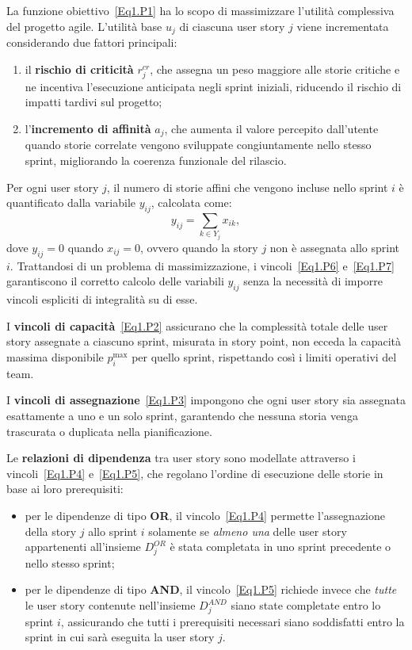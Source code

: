 \documentclass[12pt,a4paper,openright,twoside]{book}
\begin{document}
La funzione obiettivo~\eqref{Eq1.P1} ha lo scopo di massimizzare l'utilità complessiva del progetto agile.  
L'utilità base $u_j$ di ciascuna user story $j$ viene incrementata considerando due fattori principali:
\begin{enumerate}
    \item il \textbf{rischio di criticità} $r^{cr}_j$, che assegna un peso maggiore alle storie critiche e ne incentiva l'esecuzione anticipata negli sprint iniziali, riducendo il rischio di impatti tardivi sul progetto;
    \item l'\textbf{incremento di affinità} $a_j$, che aumenta il valore percepito dall'utente quando storie correlate vengono sviluppate congiuntamente nello stesso sprint, migliorando la coerenza funzionale del rilascio.
\end{enumerate}

Per ogni user story $j$, il numero di storie affini che vengono incluse nello sprint $i$ è quantificato dalla variabile $y_{ij}$, calcolata come:
\[
y_{ij} = \sum_{k \in Y_j} x_{ik},
\]
dove $y_{ij} = 0$ quando $x_{ij} = 0$, ovvero quando la story $j$ non è assegnata allo sprint $i$.  
Trattandosi di un problema di massimizzazione, i vincoli~\eqref{Eq1.P6} e~\eqref{Eq1.P7} garantiscono il corretto calcolo delle variabili $y_{ij}$ senza la necessità di imporre vincoli espliciti di integralità su di esse.

I \textbf{vincoli di capacità}~\eqref{Eq1.P2} assicurano che la complessità totale delle user story assegnate a ciascuno sprint, misurata in story point, non ecceda la capacità massima disponibile $p^{\max}_i$ per quello sprint, rispettando così i limiti operativi del team.

I \textbf{vincoli di assegnazione}~\eqref{Eq1.P3} impongono che ogni user story sia assegnata esattamente a uno e un solo sprint, garantendo che nessuna storia venga trascurata o duplicata nella pianificazione.

Le \textbf{relazioni di dipendenza} tra user story sono modellate attraverso i vincoli~\eqref{Eq1.P4} e~\eqref{Eq1.P5}, che regolano l'ordine di esecuzione delle storie in base ai loro prerequisiti:
\begin{itemize}
    \item per le dipendenze di tipo \textbf{OR}, il vincolo~\eqref{Eq1.P4} permette l'assegnazione della story $j$ allo sprint $i$ solamente se \textit{almeno una} delle user story appartenenti all'insieme $D^{OR}_j$ è stata completata in uno sprint precedente o nello stesso sprint;
    \item per le dipendenze di tipo \textbf{AND}, il vincolo~\eqref{Eq1.P5} richiede invece che \textit{tutte} le user story contenute nell'insieme $D^{AND}_j$ siano state completate entro lo sprint $i$, assicurando che tutti i prerequisiti necessari siano soddisfatti entro la sprint in cui sarà eseguita la user story $j$.
\end{itemize}
\end{document}
